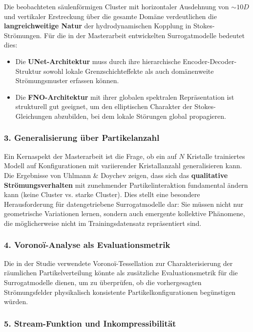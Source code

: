 \documentclass[a4paper,12pt]{article}
\begin{document}
Die beobachteten säulenförmigen Cluster mit horizontaler Ausdehnung von $\sim 10D$ und vertikaler Erstreckung über die gesamte Domäne verdeutlichen die \textbf{langreichweitige Natur} der hydrodynamischen Kopplung in Stokes-Strömungen. Für die in der Masterarbeit entwickelten Surrogatmodelle bedeutet dies:
\begin{itemize}
    \item Die \textbf{UNet-Architektur} muss durch ihre hierarchische Encoder-Decoder-Struktur sowohl lokale Grenzschichteffekte als auch domänenweite Strömungsmuster erfassen können.
    \item Die \textbf{FNO-Architektur} mit ihrer globalen spektralen Repräsentation ist strukturell gut geeignet, um den elliptischen Charakter der Stokes-Gleichungen abzubilden, bei dem lokale Störungen global propagieren.
\end{itemize}

\subsubsection*{3. Generalisierung über Partikelanzahl}

Ein Kernaspekt der Masterarbeit ist die Frage, ob ein auf $N$ Kristalle trainiertes Modell auf Konfigurationen mit variierender Kristallanzahl generalisieren kann. Die Ergebnisse von Uhlmann \& Doychev zeigen, dass sich das \textbf{qualitative Strömungsverhalten} mit zunehmender Partikelinteraktion fundamental ändern kann (keine Cluster vs. starke Cluster). Dies stellt eine besondere Herausforderung für datengetriebene Surrogatmodelle dar: Sie müssen nicht nur geometrische Variationen lernen, sondern auch emergente kollektive Phänomene, die möglicherweise nicht im Trainingsdatensatz repräsentiert sind.

\subsubsection*{4. Voronoï-Analyse als Evaluationsmetrik}

Die in der Studie verwendete Voronoï-Tessellation zur Charakterisierung der räumlichen Partikelverteilung könnte als zusätzliche Evaluationsmetrik für die Surrogatmodelle dienen, um zu überprüfen, ob die vorhergesagten Strömungsfelder physikalisch konsistente Partikelkonfigurationen begünstigen würden.

\subsubsection*{5. Stream-Funktion und Inkompressibilität}
\end{document}
